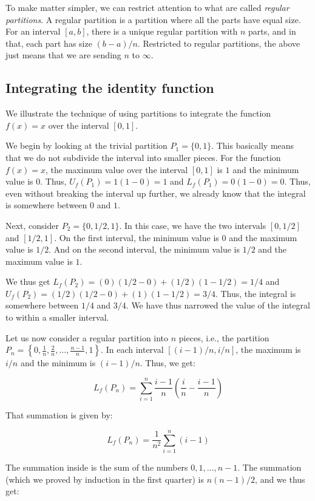 \documentclass{amsart}
\begin{document}
To make matter simpler, we can restrict attention to what are called
{\em regular partitions}. A regular partition is a partition where all
the parts have equal size. For an interval $[a,b]$, there is a unique
regular partition with $n$ parts, and in that, each part has size $(b
- a)/n$. Restricted to regular partitions, the above just means that
we are sending $n$ to $\infty$.

\subsection{Integrating the identity function}

We illustrate the technique of using partitions to integrate the
function $f(x) = x$ over the interval $[0,1]$.

We begin by looking at the trivial partition $P_1 = \{ 0, 1 \}$. This
basically means that we do not subdivide the interval into smaller
pieces. For the function $f(x) = x$, the maximum value over the
interval $[0,1]$ is $1$ and the minimum value is $0$. Thus, $U_f(P_1)
= 1(1 - 0) = 1$ and $L_f(P_1) = 0(1 - 0) = 0$. Thus, even without
breaking the interval up further, we already know that the integral is
somewhere between $0$ and $1$.

Next, consider $P_2 = \{ 0, 1/2, 1 \}$. In this case, we have the two
intervals $[0,1/2]$ and $[1/2,1]$. On the first interval, the minimum
value is $0$ and the maximum value is $1/2$. And on the second
interval, the minimum value is $1/2$ and the maximum value is $1$.

We thus get $L_f(P_2) = (0)(1/2 - 0) + (1/2)(1 - 1/2) = 1/4$ and
$U_f(P_2) = (1/2)(1/2 - 0) + (1)(1 - 1/2) = 3/4$. Thus, the integral
is somewhere between $1/4$ and $3/4$. We have thus narrowed the value
of the integral to within a smaller interval.

Let us now consider a regular partition into $n$ pieces, i.e., the
partition $P_n = \left \{ 0, \frac{1}{n}, \frac{2}{n}, \dots, \frac{n
- 1}{n}, 1 \right \}$. In each interval $[(i-1)/n,i/n]$, the maximum
is $i/n$ and the minimum is $(i-1)/n$. Thus, we get:

$$L_f(P_n) = \sum_{i=1}^n \frac{i - 1}{n} \left( \frac{i}{n} - \frac{i - 1}{n} \right)$$

That summation is given by:

$$L_f(P_n) = \frac{1}{n^2} \sum_{i = 1}^n (i - 1)$$

The summation inside is the sum of the numbers $0,1,\dots,n-1$.  The
summation (which we proved by induction in the first quarter) is
$n(n-1)/2$, and we thus get:
\end{document}
